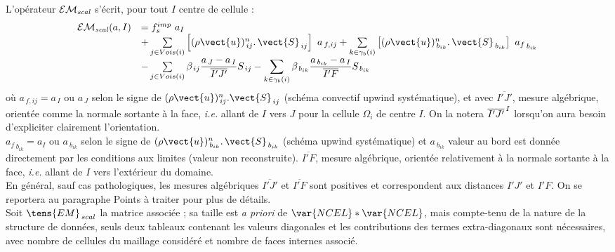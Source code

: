 L'op\'erateur $\mathcal{EM_{\it{scal}}}$ s'\'ecrit, pour tout $I$ centre de cellule :
\begin{equation}
\begin{array}{lll}
\mathcal{EM_{\it{scal}}}(a,I) &=  f_s^{imp}\ a_I \\
&+\sum\limits_{j\in Vois(i)}\left[{(\rho \vect{u})_{\,ij}^n} \text{.}\, \vect{S}_{\,ij}\right]\ a_{\,f,ij}
+\sum\limits_{k\in {\gamma_b(i)}} \left[{(\rho \vect{u})_{\,{b}_{ik}}^n}
\text{.}\, \vect{S}_{\,{b}_{ik}}\right]\ {a_f}_{\,{b}_{ik}} \\
&-\sum\limits_{j\in Vois(i)} \beta_{\,ij}\displaystyle
\frac{a_{\,J}- a_{\,I}}{\overline{I'J'}} S_{\,ij}
-\sum\limits_{k\in {\gamma_b(i)}} \beta_{\,b_{ik}}\displaystyle
\frac{a_{\,b_{ik}}-a_{\,I}}{\overline{I'F}} S_{\,b_{ik}} \\
\end{array}
\end{equation}
o\`u
$a_{\,f,ij} = a_{\,I} \text{ ou }  a_{\,J}$
selon le signe de $(\rho \vect{u})_{\,ij}^n.\vect{S}_{\,ij}$ (schéma
convectif upwind systématique),
et avec $\overline{I'J'}$, mesure alg\'ebrique, orient\'ee comme la
normale sortante \`a la face, {\it i.e.} allant de $I$ vers $J$ pour la cellule
$\Omega_i$ de centre $I$. On la
notera ${\overline{I'J'}^{\tiny {\,I}}}$ lorsqu'on aura besoin d'expliciter
clairement l'orientation.\\
${a_f}_{\,{b}_{ik}} = a_I \text{ ou  }
a_{\ {b}_{ik}}$ selon le signe de
${(\rho \vect{u})_{\,{b}_{ik}}^n}\text{.}\, \vect{S}_{\,{b}_{ik}}$ (schéma
upwind systématique)
et $a_{\ {b}_{ik}}$ valeur au bord est donn\'ee directement par les conditions
aux limites (valeur non reconstruite). $\overline{I'F}$, mesure alg\'ebrique, orient\'ee relativement \`a la
normale sortante \`a la face, {\it i.e.} allant de $I$ vers l'ext\'erieur du domaine.\\
En g\'en\'eral, sauf cas pathologiques, les mesures alg\'ebriques
$\overline{I'J'}$ et $\overline{I'F}$
sont positives et correspondent aux distances $I'J'$ et $I'F$. On se reportera
au paragraphe Points \`a traiter pour plus de d\'etails.\\
Soit ${\tens{EM}}_{\,scal}$ la matrice associ\'ee ; sa taille est {\it a priori} de
$\var{NCEL} * \var{NCEL}$, mais compte-tenu de la nature de la structure de
donn\'ees, seuls deux tableaux  contenant les valeurs
diagonales et  les contributions des termes extra-diagonaux sont n\'ecessaires, avec  nombre de
cellules du maillage consid\'er\'e et  nombre de faces internes associ\'e.\\
